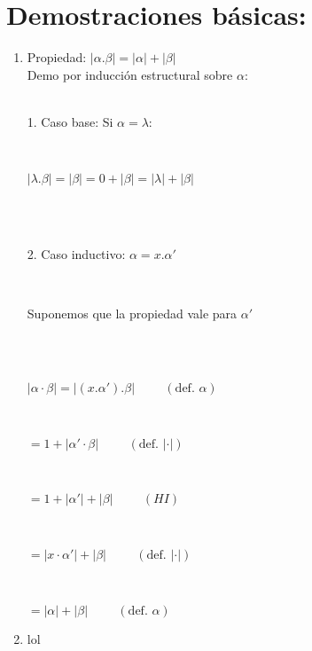 \documentclass[12pt]{article}
\begin{document}
\section{Demostraciones básicas:}
\renewcommand\labelenumi{(\theenumi)}
\begin{enumerate}
    \item {Propiedad: $|\alpha . \beta| = |\alpha|+|\beta|$}
    \\
    Demo por inducción estructural sobre $\alpha$:
    \\
    \\
    \centerline{1. Caso base: Si $\alpha = \lambda$:}
    \\
    \centerline{$|\lambda.\beta| = |\beta| = 0 + |\beta| = |\lambda| + |\beta|$}
    \\
    \\
    \centerline{2. Caso inductivo: $\alpha = x.\alpha'$}
    \\
    \centerline{Suponemos que la propiedad vale para $\alpha'$}
    \\
    \\
    \centerline{$|\alpha \cdot \beta| = |(x.\alpha').\beta| \hspace{1cm} (\text{def. } \alpha)$}
    \\
    \centerline{$= 1 + |\alpha' \cdot \beta | \hspace{1cm} (\text{def. } |\cdot|)$}
    \\
    \centerline{$= 1 + |\alpha'| + |\beta| \hspace{1cm} (HI)$}
    \\
    \centerline{$= |x \cdot \alpha'| + |\beta| \hspace{1cm} (\text{def. } |\cdot|)$}
    \\
    \centerline{$= |\alpha| + |\beta| \hspace{1cm} (\text{def. } \alpha)$}
    \item{lol}
\end{enumerate}
\end{document}
